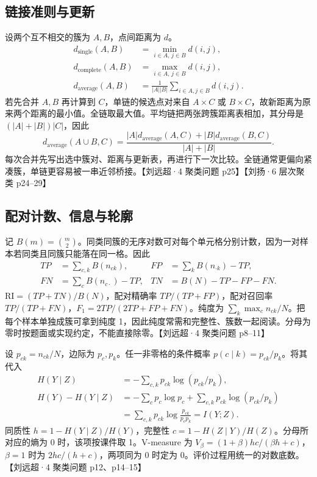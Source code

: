 \documentclass[UTF8,a4paper,zihao=-4,fontset=fandol]{ctexrep}
\begin{document}
\subsection{链接准则与更新}
设两个互不相交的簇为 $A,B$，点间距离为 $d$。
\[
\begin{aligned}
d_{\mathrm{single}}(A,B)&=\min_{i\in A,\,j\in B}d(i,j),\\
d_{\mathrm{complete}}(A,B)&=\max_{i\in A,\,j\in B}d(i,j),\\
d_{\mathrm{average}}(A,B)&=\frac{1}{|A||B|}\sum_{i\in A,j\in B}d(i,j).
\end{aligned}
\]
若先合并 $A,B$ 再计算到 $C$，单链的候选点对来自 $A\times C$ 或 $B\times C$，故新距离为原来两个距离的最小值。全链取最大值。平均链把两张跨簇距离表相加，其分母是 $(|A|+|B|)|C|$，因此
\[
d_{\mathrm{average}}(A\cup B,C)
=\frac{|A|d_{\mathrm{average}}(A,C)+|B|d_{\mathrm{average}}(B,C)}{|A|+|B|}.
\]
每次合并先写出选中簇对、距离与更新表，再进行下一次比较。全链通常更偏向紧凑簇，单链更容易被一串近邻桥接。【刘远超·4 聚类问题 p25】【刘扬·6 层次聚类 p24–29】

\subsection{配对计数、信息与轮廓}
记 $B(m)=\binom m2$。同类同簇的无序对数可对每个单元格分别计数，因为一对样本若同类且同簇只能落在同一格。因此
\[
\begin{aligned}
TP&=\sum_{c,k}B(n_{ck}),&
FP&=\sum_k B(n_{\cdot k})-TP,\\
FN&=\sum_c B(n_{c\cdot})-TP,&
TN&=B(N)-TP-FP-FN .
\end{aligned}
\]
$\mathrm{RI}=(TP+TN)/B(N)$，配对精确率 $TP/(TP+FP)$，配对召回率 $TP/(TP+FN)$，$F_1=2TP/(2TP+FP+FN)$。纯度为 $\sum_k \max_c n_{ck}/N$。把每个样本单独成簇可拿到纯度 1，因此纯度常需和完整性、簇数一起阅读。分母为零时按题面或实现约定，不能直接除零。【刘远超·4 聚类问题 p8–11】

设 $p_{ck}=n_{ck}/N$，边际为 $p_c,p_k$。任一非零格的条件概率 $p(c\mid k)=p_{ck}/p_k$。将其代入
\[
\begin{aligned}
H(Y\mid Z)&=-\sum_{c,k}p_{ck}\log(p_{ck}/p_k),\\
H(Y)-H(Y\mid Z)
&=-\sum_c p_c\log p_c+\sum_{c,k}p_{ck}\log(p_{ck}/p_k)\\
&=\sum_{c,k}p_{ck}\log\frac{p_{ck}}{p_cp_k}=I(Y;Z).
\end{aligned}
\]
同质性 $h=1-H(Y\mid Z)/H(Y)$，完整性 $c=1-H(Z\mid Y)/H(Z)$。分母所对应的熵为 0 时，该项按课件取 1。V-measure 为 $V_\beta=(1+\beta)hc/(\beta h+c)$，$\beta=1$ 时为 $2hc/(h+c)$，两项同为 0 时定为 0。评价过程用统一的对数底数。【刘远超·4 聚类问题 p12、p14–15】
\end{document}
